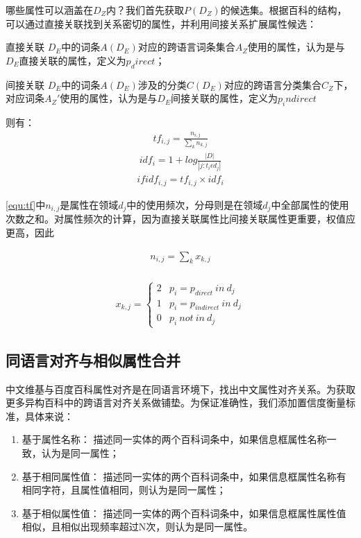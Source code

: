 哪些属性可以涵盖在$D_Z$内？我们首先获取$P(D_Z)$的候选集。根据百科的结构，可以通过直接关联找到关系密切的属性，并利用间接关系扩展属性候选：

{\heiti 直接关联} $D_E$中的词条$A(D_E)$对应的跨语言词条集合$A_Z$使用的属性，认为是与$D_E$直接关联的属性，定义为$p_direct$；

{\heiti 间接关联} $D_E$中的词条$A(D_E)$涉及的分类$C(D_E)$对应的跨语言分类集合$C_Z$下，对应词条$A_Z'$使用的属性，认为是与$D_E$间接关联的属性，定义为$p_indirect$

则有：
\begin{align}
\label{equ:tf}
tf_{i,j}=\frac{n_{i,j}}{\sum_{k}{n_{k,j}}}
\end{align}
\begin{align}
\label{equ:idf}
idf_{i}=1+log\frac{\left | D \right |}{\left | j:t_i  \epsilon d_j \right |}
\end{align}
\begin{align}
\label{equ:tfidf}
ifidf_{i,j}=tf_{i,j}\times idf_{i}
\end{align}

\ref{equ:tf}中$n_{i,j}$是属性在领域$d_{j}$中的使用频次，分母则是在领域$d_{j}$中全部属性的使用次数之和。对属性频次的计算，因为直接关联属性比间接关联属性更重要，权值应更高，因此

\begin{align}
n_{i,j} = {\sum_{k}{x_{k,j}}}\\
\end{align}

\begin{align}
x_{k,j} =
\left\{\begin{matrix}
2 & p_i = p_{direct} \ in \ d_j\\
1 & p_i = p_{indirect} \ in \ d_j\\
0 & p_i \ not \ in \ d_j
\end{matrix}\right.
\end{align}

\subsection{同语言对齐与相似属性合并}
\label{sec:similar-property}

{\heiti 中文维基与百度百科属性对齐}是在同语言环境下，找出中文属性对齐关系。为获取更多异构百科中的跨语言对齐关系做铺垫。为保证准确性，我们添加置信度衡量标准，具体来说：

\begin{enumerate}[1)]
\item {\heiti 基于属性名称：}   描述同一实体的两个百科词条中，如果信息框属性名称一致，认为是同一属性；
\item {\heiti 基于相同属性值：} 描述同一实体的两个百科词条中，如果信息框属性名称有相同字符，且属性值相同，则认为是同一属性；
\item {\heiti 基于相似属性值：} 描述同一实体的两个百科词条中，如果信息框属性属性值相似，且相似出现频率超过N次，则认为是同一属性。
\end{enumerate}

